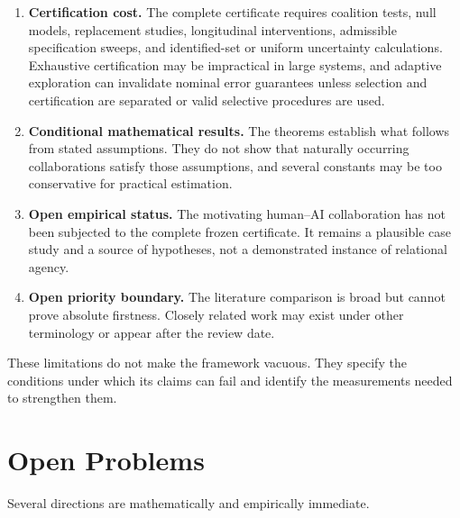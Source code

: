\begin{enumerate}
\item \textbf{Certification cost.} The complete certificate requires coalition tests, null models,
replacement studies, longitudinal interventions, admissible specification sweeps, and identified-set or
uniform uncertainty calculations. Exhaustive certification may be impractical in large systems, and
adaptive exploration can invalidate nominal error guarantees unless selection and certification are
separated or valid selective procedures are used.

\item \textbf{Conditional mathematical results.} The theorems establish what follows from stated
assumptions. They do not show that naturally occurring collaborations satisfy those assumptions, and
several constants may be too conservative for practical estimation.

\item \textbf{Open empirical status.} The motivating human--AI collaboration has not been subjected to
the complete frozen certificate. It remains a plausible case study and a source of hypotheses, not a
demonstrated instance of relational agency.

\item \textbf{Open priority boundary.} The literature comparison is broad but cannot prove absolute
firstness. Closely related work may exist under other terminology or appear after the review date.
\end{enumerate}

These limitations do not make the framework vacuous. They specify the conditions under which its claims
can fail and identify the measurements needed to strengthen them.

\section{Open Problems}

Several directions are mathematically and empirically immediate.

